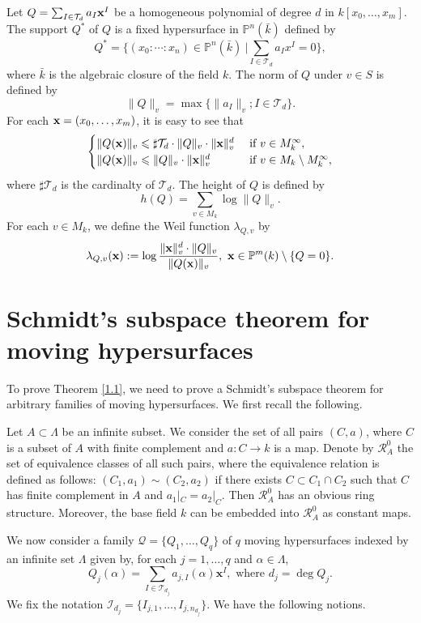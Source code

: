 \documentclass[12pt,leqno]{amsart}
\renewcommand{\P}{{\mathbb{P}}}
\numberwithin{equation}{section}
\begin{document}
Let $Q=\sum_{I\in\mathcal T_d}a_I{\bf x}^I$ be a homogeneous polynomial of degree $d$ in $k[x_0,\ldots, x_m]$. The support $Q^*$ of $Q$ is a fixed hypersurface in $\P^n(\bar k)$ defined by
$$ Q^*=\{(x_0:\cdots:x_n)\in \P^n(\bar k)\ | \sum_{I\in\mathcal T_d}a_Ix^I=0\},$$
where $\bar k$ is the algebraic closure of the field $k$. The norm of $Q$ under $v\in S$ is defined by
$$\|Q\|_v =\max\{\|a_I\|_v; I\in\mathcal T_d\}.$$ 
For each ${\bf x}=(x_0,\ldots, x_m)$, it is easy to see that
\begin{align*}
\begin{cases}
\|Q({\bf x})\|_v\leqslant \sharp\mathcal T_d\cdot \|Q\|_v\cdot \|{\bf x}\|^d_v &\text{ if }v\in M^\infty_k,\\
\|Q({\bf x})\|_v\leqslant \|Q\|_v\cdot \|{\bf x}\|^d_v &\text{ if }v\in M_k\setminus M^\infty_k,
\end{cases}
\end{align*}
where $\sharp\mathcal T_d$ is the cardinalty of $\mathcal T_d$.
The height of $Q$ is defined by
$$h(Q)=\sum_{v\in M_k}\log \|Q\|_v.$$
For each $v\in M_k$, we define the Weil function $\lambda_{Q,v}$ by
$$\lambda_{Q,v}({\bf x}):=\log\frac{\|{\bf x}\|_v^d\cdot \|Q\|_v}{\|Q({\bf x})\|_v},\ {\bf x}\in\P^m(k)\setminus\{Q=0\}.$$ 

\section{Schmidt's subspace theorem for moving hypersurfaces}
To prove Theorem \ref{1.1}, we need to prove a Schmidt's subspace theorem for arbitrary families of moving hypersurfaces. We first recall the following.


Let $A\subset\Lambda$  be an infinite subset. We consider the set of all pairs $(C,a)$, where $C$ is a subset of $A$ with finite complement and $a: C\to k$ is a map. Denote by $\mathcal R_{A}^{0}$ the set of equivalence classes of all such pairs, where the equivalence relation is defined as follows: $(C_1,a_1) \sim (C_2,a_2)$ if there exists $C\subset C_1\cap C_2$ such that $C$ has finite complement in $A$ and $a_1|_{C}=a_2|_{C}.$ Then $\mathcal R_{A}^{0}$ has an obvious ring structure. Moreover, the base field $k$ can be embedded into $\mathcal R_{A}^{0}$ as constant maps.

We now consider a family $\mathcal Q=\{Q_{1},\ldots, Q_{q}\}$ of $q$ moving hypersurfaces indexed by an infinite set $\Lambda$ given by, for each $j=1,\ldots,q$ and $\alpha \in \Lambda$,
$$Q_j(\alpha)=\sum_{I \in \mathcal{T}_{d_j}}a_{j, I}(\alpha)\mathbf{x}^{I},\text{ where $d_j=\deg Q_j$.}$$
We fix the notation $\mathcal{I}_{d_j}=\{I_{j,1},\ldots,I_{j,n_{d_j}}\}$. We have the following notions.
\end{document}
